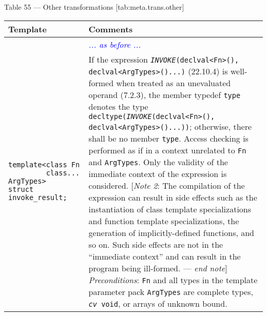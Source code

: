 \documentclass{article}
\begin{document}
\begin{center}
  Table 55 — Other transformations [tab:meta.trans.other]
  \begin{tabular}[t]{ | p{6cm} p{12cm} | }
    \hline
    Template & Comments \\ 
    \hline\hline
    & \textcolor{blue}{\textit{... as before ...}} \\
    \hline
    \makecell[l]{\texttt{template<class Fn} \\
                 \texttt{\ \ \ \ \ \ \ \ \ class... ArgTypes>} \\
                 \texttt{struct invoke\_result;}} &
    \makecell[l]{If the expression \texttt{\textit{INVOKE}(declval<Fn>(),} \\
                 \texttt{declval<ArgTypes>()...)} (22.10.4) is well-formed when treated as \\
                 an unevaluated operand (7.2.3), the member typedef \texttt{type} denotes \\
                 the type \texttt{decltype(\textit{INVOKE}(declval<Fn>(),} \\
                 \texttt{declval<ArgTypes>()...))}; otherwise, there shall be no member \\
                 \texttt{type}. Access checking is performed as if in a context unrelated to \texttt{Fn} \\
                 and \texttt{ArgTypes}. Only the validity of the immediate context of the \\
                 expression is considered. \\
                 $[$\textit{Note 2}: The compilation of the expression can result in side effects such as \\
                 the instantiation of class template specializations and function template \\
                 specializations, the generation of implicitly-defined functions, and so on. \\
                 Such side effects are not in the ``immediate context'' and can result in the \\
                 program being ill-formed. --- \textit{end note}$]$ \\
                 \textit{Preconditions}: \texttt{Fn} and all types in the template parameter pack \\
                 \texttt{ArgTypes} are complete types, \texttt{\textit{cv} void}, or arrays of unknown bound.
                 } \\

\end{tabular}
\end{center}
\end{document}
